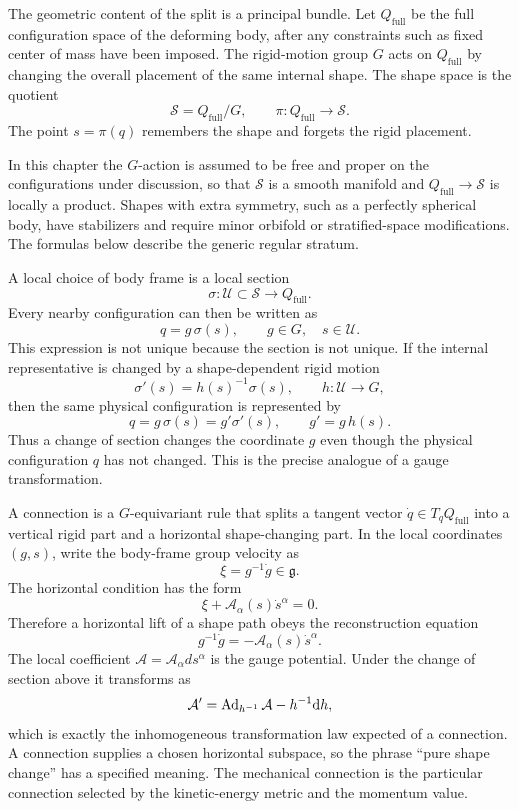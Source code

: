 The geometric content of the split is a principal bundle.  Let
\(Q_{\mathrm{full}}\)
be the full configuration space of the deforming body, after any constraints
such as fixed center of mass have been imposed.  The rigid-motion group \(G\)
acts on \(Q_{\mathrm{full}}\) by changing the overall placement of the same
internal shape.  The shape space is the quotient
\[
  \mathcal S=Q_{\mathrm{full}}/G,
  \qquad
  \pi:Q_{\mathrm{full}}\to\mathcal S .
\]
The point \(s=\pi(q)\) remembers the shape and forgets the rigid placement.

\begin{hypothesis}
In this chapter the \(G\)-action is assumed to be free and proper on the
configurations under discussion, so that \(\mathcal S\) is a smooth manifold
and \(Q_{\mathrm{full}}\to\mathcal S\) is locally a product.  Shapes with
extra symmetry, such as a perfectly spherical body, have stabilizers and require
minor orbifold or stratified-space modifications.  The formulas below describe
the generic regular stratum.
\end{hypothesis}

A local choice of body frame is a local section
\[
  \sigma:\mathcal U\subset\mathcal S\to Q_{\mathrm{full}}.
\]
Every nearby configuration can then be written as
\[
  q=g\,\sigma(s),
  \qquad g\in G,\quad s\in\mathcal U.
\]
This expression is not unique because the section is not unique.  If the
internal representative is changed by a shape-dependent rigid motion
\[
  \sigma'(s)=h(s)^{-1}\sigma(s),
  \qquad h:\mathcal U\to G,
\]
then the same physical configuration is represented by
\[
  q=g\,\sigma(s)=g'\sigma'(s),
  \qquad
  g'=g\,h(s).
\]
Thus a change of section changes the coordinate \(g\) even though the physical
configuration \(q\) has not changed.  This is the precise analogue of a gauge
transformation.

A connection is a \(G\)-equivariant rule that splits a tangent vector
\(\dot q\in T_qQ_{\mathrm{full}}\) into a vertical rigid part and a horizontal
shape-changing part.  In the local coordinates \((g,s)\), write the body-frame
group velocity as
\[
  \xi=g^{-1}\dot g\in\mathfrak g .
\]
The horizontal condition has the form
\[
  \xi+\mathcal A_\alpha(s)\dot s^\alpha=0.
\]
Therefore a horizontal lift of a shape path obeys the reconstruction equation
\[
  g^{-1}\dot g=-\mathcal A_\alpha(s)\dot s^\alpha .
\]
The local coefficient \(\mathcal A=\mathcal A_\alpha ds^\alpha\) is the gauge
potential.  Under the change of section above it transforms as
\[
  \mathcal A'
  =
  \operatorname{Ad}_{h^{-1}}\mathcal A-h^{-1}\mathrm{d} h,
\]
which is exactly the inhomogeneous transformation law expected of a connection.
A connection supplies a chosen horizontal subspace, so the phrase ``pure shape
change'' has a specified meaning. The mechanical connection is the
particular connection selected by the kinetic-energy metric and the momentum
value.

